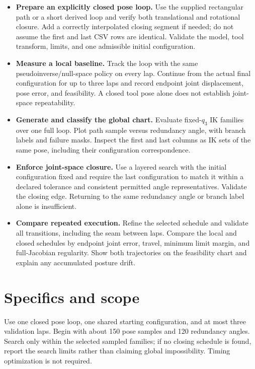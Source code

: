 \documentclass[11pt,a4paper]{article}
\begin{document}
\begin{itemize}
  \item \textbf{Prepare an explicitly closed pose loop.} Use the supplied rectangular path
or a short derived loop and verify both translational and rotational
closure. Add a correctly interpolated closing segment if needed; do not
assume the first and last CSV rows are identical. Validate the model,
tool transform, limits, and one admissible initial configuration.

  \item \textbf{Measure a local baseline.} Track the loop with the same
pseudoinverse/null-space policy on every lap. Continue from the actual
final configuration for up to three laps and record endpoint joint
displacement, pose error, and feasibility. A closed tool pose alone does
not establish joint-space repeatability.

  \item \textbf{Generate and classify the global chart.} Evaluate fixed-$q_3$
IK families over one full loop. Plot path sample versus redundancy angle,
with branch labels and failure masks. Inspect the first and last columns
as IK sets of the same pose, including their configuration correspondence.

  \item \textbf{Enforce joint-space closure.} Use a layered search with the
initial configuration fixed and require the last configuration to match
it within a declared tolerance and consistent permitted angle
representatives. Validate the closing edge. Returning to the same
redundancy angle or branch label alone is insufficient.

  \item \textbf{Compare repeated execution.} Refine the selected schedule and
validate all transitions, including the seam between laps. Compare the
local and closed schedules by endpoint joint error, travel, minimum
limit margin, and full-Jacobian regularity. Show both trajectories on
the feasibility chart and explain any accumulated posture drift.
\end{itemize}

\newpage
\section*{Specifics and scope}
Use one closed pose loop, one shared starting configuration, and
at most three validation laps. Begin with about 150 pose samples and
120 redundancy angles. Search only within the selected sampled families;
if no closing schedule is found, report the search limits rather than
claiming global impossibility. Timing optimization is not required.
\end{document}
